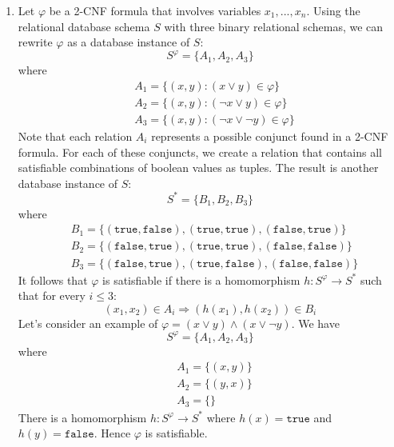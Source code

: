\begin{enumerate}
    \item Let $\varphi$ be a 2-CNF formula that involves variables $x_1,...,x_n$. Using the 
    relational database schema $S$ with three binary relational schemas, we can rewrite 
    $\varphi$ as a database instance of $S$:
    \begin{equation*}
        S^{\varphi} = \{A_1, A_2, A_3\}
    \end{equation*}
    where 
    \begin{align*}
        & A_1 = \{(x,y) : (x \lor y) \in \varphi\} \\
        & A_2 = \{(x,y) : (\neg x \lor y) \in \varphi\} \\
        & A_3 = \{(x,y) : (\neg x \lor \neg y) \in \varphi \}
    \end{align*}
    Note that each relation $A_i$ represents a possible conjunct found in a 2-CNF formula. 
    For each of these conjuncts, we create a relation that contains 
    all satisfiable combinations of boolean values as tuples. The result is another database instance 
    of $S$:
    \begin{equation*}
        S^* = \{B_1, B_2, B_3\}
    \end{equation*}
    where 
    \begin{align*}
        & B_1 = \{(\texttt{true}, \texttt{false}), (\texttt{true}, \texttt{true}), (\texttt{false}, \texttt{true})\} \\
        & B_2 = \{(\texttt{false}, \texttt{true}), (\texttt{true}, \texttt{true}), (\texttt{false}, \texttt{false})\} \\
        & B_3 = \{(\texttt{false}, \texttt{true}), (\texttt{true}, \texttt{false}), (\texttt{false}, \texttt{false})\} 
    \end{align*}
    It follows that $\varphi$ is satisfiable if there is a homomorphism $h: S^{\varphi} \rightarrow S^*$ 
    such that for every $i \leq 3$:
    \begin{equation*}
        (x_1, x_2) \in A_i \Rightarrow (h(x_1), h(x_2)) \in B_i
    \end{equation*}
    Let's consider an example of $\varphi = (x \lor y) \land (x \lor \neg y)$. We have 
    \begin{equation*}
        S^{\varphi} = \{A_1, A_2, A_3\}
    \end{equation*}
    where 
    \begin{align*}
        & A_1 = \{(x,y)\} \\
        & A_2 = \{(y,x)\} \\
        & A_3 = \{\}
    \end{align*}
    There is a homomorphism $h: S^{\varphi} \rightarrow S^*$ where $h(x) = \texttt{true}$ and $h(y) = 
    \texttt{false}$. Hence $\varphi$ is satisfiable.


\end{enumerate}
